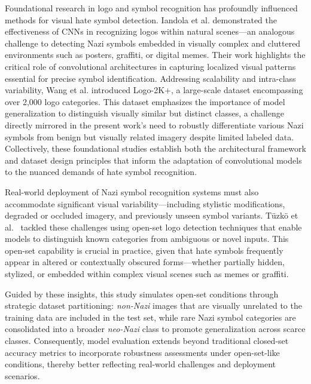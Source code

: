 Foundational research in logo and symbol recognition has profoundly influenced methods for visual hate symbol
detection. Iandola et al.\parencite{iandola2015deeplogo} demonstrated the effectiveness of \ac{CNN}s in
recognizing logos within natural scenes—an analogous challenge to detecting Nazi symbols
embedded in visually complex and cluttered environments such as posters, graffiti, or digital memes. Their work
highlights the critical role of convolutional architectures in capturing localized visual patterns essential for
precise symbol identification. Addressing scalability and intra-class variability, Wang et al.
\parencite{li2020logo2k} introduced Logo-2K+, a large-scale dataset encompassing over 2,000 logo categories. This
dataset emphasizes the importance of model generalization to distinguish visually similar but distinct classes, a
challenge directly mirrored in the present work’s need to robustly differentiate various Nazi symbols from benign
but visually related imagery despite limited labeled data. Collectively, these foundational studies establish both
the architectural framework and dataset design principles that inform the adaptation of convolutional models to the
nuanced demands of hate symbol recognition.

Real-world deployment of Nazi symbol recognition systems must also accommodate significant visual
variability—including stylistic modifications, degraded or occluded imagery, and previously unseen symbol variants.
Tüzkö et al.~\parencite{tuzko2020open} tackled these challenges using open-set logo detection techniques that enable
models to distinguish known categories from ambiguous or novel inputs. This open-set capability is crucial in
practice, given that hate symbols frequently appear in altered or contextually obscured forms—whether partially
hidden, stylized, or embedded within complex visual scenes such as memes or graffiti.

Guided by these insights, this study simulates open-set conditions through strategic dataset partitioning:
\textit{non-Nazi} images that are visually unrelated to the training data are included in the test set, while rare
Nazi symbol categories are consolidated into a broader \textit{neo-Nazi} class to promote generalization across
scarce classes. Consequently, model evaluation extends beyond traditional closed-set accuracy metrics to
incorporate robustness assessments under open-set-like conditions, thereby better reflecting real-world challenges
and deployment scenarios.

